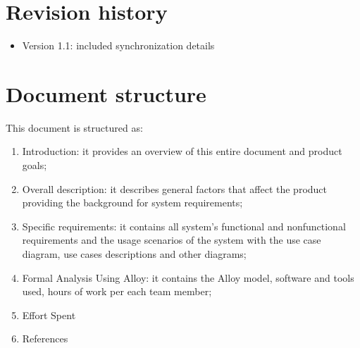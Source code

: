 \section{Revision history}
\begin{itemize}
\item Version 1.1: included synchronization details
\end{itemize} 

\section{Document structure}
This document is structured as:
\begin{enumerate}
\item Introduction: it provides an overview of this entire document and product goals;
\item Overall description: it describes general factors that affect the product providing the background for system requirements;
\item Specific requirements: it contains all system's functional and nonfunctional requirements and the usage scenarios of the system with the use case diagram, use cases descriptions and other diagrams;
\item Formal Analysis Using Alloy: it contains the Alloy model, software and tools used, hours of work per each team member;
\item Effort Spent
\item References
\end{enumerate}


 
